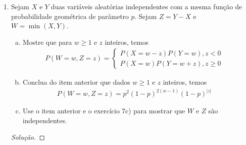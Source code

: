 \documentclass[../Notas.tex]{subfiles}
\begin{document}
\begin{enumerate}
\begin{proof}[Solução]
\begin{enumerate}[a)]
            Após algumas simplificações, chegamos em
            \[
            P(X\geq Y) = \frac{p_2}{p_1 + p_2 - p_1p_2}.
            \]
            \item Temos
            \begin{align*}
                P(X=Y) &= \sum_{i=1}^{\infty} P(X=i)P(Y=i) \\
                       &= \frac{p_1p_2}{p_1 + p_2 - p_1p_2}
            \end{align*}
            após algumas simplificações.
            \item Para $k=1,2,\dots$, temos que
            \[
            P(Z>k) = P(X>k)P(Y>k) = [(1-p_1)(1-p_2)]^k.
            \]
            Daí,
            \[
            F_Z(k) = \begin{cases}
            0, k < 1 \\
            1 - [(1-p_1)(1-p_2)]^{[k]}, k\geq 1.
            \end{cases}
            \]
            Logo, $Z \sim\text{Geo}(1 - (1-p_1)(1-p_2)) = \text{Geo}(p_1 + p_2 - p_1p_2)$.
        \end{enumerate}
    \end{proof}
    \item Sejam $X$ e $Y$ duas variáveis aleatórias independentes com a mesma função de probabilidade geométrica de parâmetro $p$. Sejam $Z=Y-X$ e $W=\min(X,Y)$.
    \begin{enumerate}[a)]
    \item Mostre que para $w\geq 1$ e $z$ inteiros, temos
    \begin{align*}
        P(W=w, Z=z) = \begin{cases}
        P(X = w-z)P(Y=w), z < 0 \\
        P(X=w)P(Y = w+z), z\geq 0
        \end{cases}
    \end{align*}
    \item Conclua do item anterior que dados $w\geq 1$ e $z$ inteiros, temos
    \begin{align*}
        P(W=w, Z=z) = p^2(1-p)^{2(w-1)}(1-p)^{|z|}
    \end{align*}
    \item Use o item anterior e o exercício 7c) para mostrar que $W$ e $Z$ são independentes.
    \end{enumerate}
    \begin{proof}[Solução]

\end{proof}
\end{enumerate}
\end{document}
